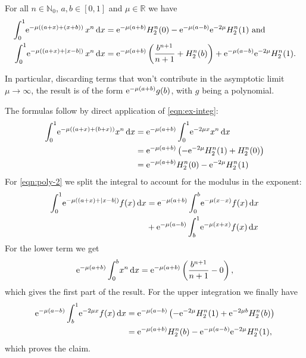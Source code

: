 \begin{Lemma}
  \label{lem:asymp-1}
  For all $n\in\mathbb{N}_0$, $a,b\in[0,1]$ and $\mu\in\mathbb{R}$ we
  have
  \begin{align}
    \label{eqn:poly-1}
    \Int{x}{\Eto{-\mu((a + x) + (x + b))}\,x^n} &= \Eto{-\mu(a+b)}H_2^n(0) -
    \Eto{-\mu(a-b)}\Eto{-2\mu}H^n_2(1) \text{ and }\\
    \label{eqn:poly-2}
    \Int{x}{\Eto{-\mu((a + x) + \Abs{x - b})}\,x^n} &=
    \Eto{-\mu(a+b)}\left(\frac{b^{n+1}}{n+1} + H_2^n(b)\right) +
    \Eto{-\mu(a-b)}\Eto{-2\mu}H^n_2(1).
  \end{align}
  \begin{Remark}
    In particular, discarding terms that won't contribute in the asymptotic limit
    $\mu\to\infty$, the result is of the form $\Eto{-\mu(a+b)}g(b)$, with $g$
    being a polynomial.
  \end{Remark}
  \begin{Proof}
    The formulas follow by direct application of \cref{eqn:ex-integ}:
    \begin{align*}
      \Int{x}{\Eto{-\mu((a+x)+(b+x))}x^n} &= \Eto{-\mu(a+b)}\Int{x}{\Eto{-2\mu x}x^n} \\
        &= \Eto{-\mu(a+b)}\left(-\Eto{-2\mu}H^n_2(1) + H^n_2(0)\right) \\
        &= \Eto{-\mu(a+b)} H^n_2(0) - \Eto{-2\mu} H^n_2(1)
    \end{align*}
    For \cref{eqn:poly-2} we split the integral to account for the modulus in
    the exponent:
    \begin{align*}
      \Int{x}{\Eto{-\mu( (a+x) + \Abs{x - b})}f(x)} &=
      \Eto{-\mu(a+b)}\Integ[b]{0}{x}{\Eto{-\mu(x-x)}f(x)} \\ &+
      \Eto{-\mu(a-b)}\Integ[1]{b}{x}{\Eto{-\mu(x+x)}f(x)}
    \end{align*}
    For the lower term we get
    \begin{equation*}
      \Eto{-\mu(a+b)}\Integ[b]{0}{x}{x^n} =
      \Eto{-\mu(a+b)}\left(\frac{b^{n+1}}{n+1} - 0\right),
    \end{equation*}
    which gives the first part of the result. For the upper integration we
    finally have
    \begin{align*}
      \Eto{-\mu(a-b)}\Integ[1]{b}{x}{\Eto{-2\mu x}f(x)} &=
      \Eto{-\mu(a-b)}\left(-\Eto{-2\mu}H^n_2(1) + \Eto{-2\mu b}H^n_2(b)\right) \\
      &= \Eto{-\mu(a+b)}H^n_2(b) - \Eto{-\mu(a-b)}\Eto{-2\mu}H^n_2(1),
    \end{align*}
    which proves the claim.
  \end{Proof}
\end{Lemma}
